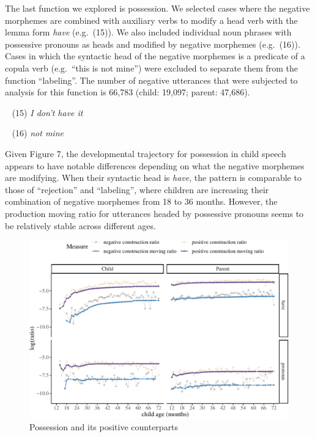 \documentclass[
  english,
  man,floatsintext]{apa6}
\begin{document}
The last function we explored is possession. We selected cases where the negative morphemes are combined with auxiliary verbs to modify a head verb with the lemma form \emph{have} (e.g.~(15)). We also included individual noun phrases with possessive pronouns as heads and modified by negative morphemes (e.g.~(16)). Cases in which the syntactic head of the negative morphemes is a predicate of a copula verb (e.g.~\enquote{this is not mine}) were excluded to separate them from the function \enquote{labeling}. The number of negative utterances that were subjected to analysis for this function is 66,783 (child: 19,097; parent: 47,686).

~
(15) \emph{I don't have it}

~
(16) \emph{not mine}

Given Figure 7, the developmental trajectory for possession in child speech appears to have notable differences depending on what the negative morphemes are modifying. When their syntactic head is \emph{have}, the pattern is comparable to those of \enquote{rejection} and \enquote{labeling}, where children are increasing their combination of negative morphemes from 18 to 36 months. However, the production moving ratio for utterances headed by possessive pronouns seems to be relatively stable across different ages.

\begin{figure}[H]

{\centering \includegraphics{neg_construction_article_files/figure-latex/possession-1} 

}

\caption{Possession and its positive counterparts}\label{fig:possession}
\end{figure}
\end{document}
